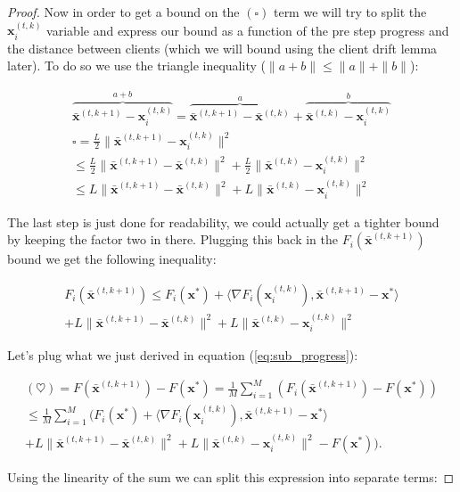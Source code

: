 \begin{proof}
Now in order to get a bound on the $(\square)$ term we will try to split the $\bm{x}_i^{(t,k)}$ variable and express our bound as a function of the  pre step progress and the distance between clients (which we will bound using the client drift lemma later). To do so we use the triangle inequality ($\|a+b\| \leq \|a\|+\|b\|$):


\begin{align*}
    \overbrace{\bar{\bm{x}}^{(t,k+1)}-\bm{x}_i^{(t,k)}}^{a+b} = \overbrace{\bar{\bm{x}}^{(t,k+1)} - \bar{\bm{x}}^{(t,k)}}^a + \overbrace{\bar{\bm{x}}^{(t,k)} - \bm{x}_i^{(t,k)} }^b\\
    \square = \frac{L}{2} \|\bar{\bm{x}}^{(t,k+1)}-\bm{x}_i^{(t,k)} \|^2 \\
    \leq  \frac{L}{2} \|\bar{\bm{x}}^{(t,k+1)}-\bar{\bm{x}}^{(t,k)} \|^2  + \frac{L}{2} \|\bar{\bm{x}}^{(t,k)}-\bm{x}_i^{(t,k)} \|^2  \\
    \leq  L \|\bar{\bm{x}}^{(t,k+1)}-\bar{\bm{x}}^{(t,k)} \|^2  + L \|\bar{\bm{x}}^{(t,k)}-\bm{x}_i^{(t,k)} \|^2 
\end{align*}

The last step is just done for readability, we could actually get a tighter bound by keeping the factor two in there. Plugging this back in the $F_i(\bar{\bm{x}}^{(t,k+1)})$ bound we get the following inequality:


\begin{align*}
    F_i(\bar{\bm{x}}^{(t,k+1)}) \leq F_i(\bm{x}^{*}) +  \langle \nabla F_i(\bm{x}_i^{(t,k)}) ,\bar{\bm{x}}^{(t,k+1)} - \bm{x}^{*} \rangle \\+ L \|\bar{\bm{x}}^{(t,k+1)}-\bar{\bm{x}}^{(t,k)} \|^2  + L \|\bar{\bm{x}}^{(t,k)}-\bm{x}_i^{(t,k)} \|^2 
\end{align*}

Let's plug what we just derived in equation (\ref{eq:sub_progress}):


\begin{align*}
    (\heartsuit) = F(\bar{\bm{x}}^{(t,k+1)}) - F(\bm{x}^*) = \frac{1}{M} \sum_{i=1}^M \left( F_i(\bar{\bm{x}}^{(t,k+1)})  - F(\bm{x}^*)\right) \\
    \leq  \frac{1}{M} \sum_{i=1}^M \Big( F_i(\bm{x}^{*}) +  \langle \nabla F_i(\bm{x}_i^{(t,k)}) ,\bar{\bm{x}}^{(t,k+1)} - \bm{x}^{*} \rangle \\+ L \|\bar{\bm{x}}^{(t,k+1)}-\bar{\bm{x}}^{(t,k)} \|^2  + L \|\bar{\bm{x}}^{(t,k)}-\bm{x}_i^{(t,k)} \|^2  - F(\bm{x}^*)\Big).
\end{align*}

Using the linearity of the sum we can split this expression into separate terms:


\end{proof}
